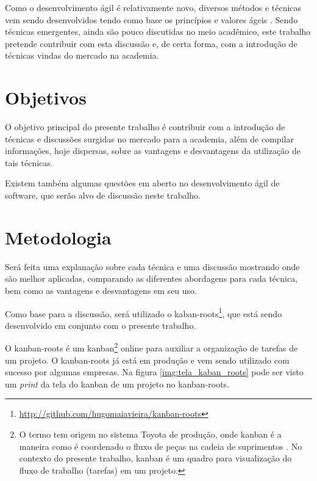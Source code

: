 Como o desenvolvimento ágil é relativamente novo, diversos métodos e técnicas
vem sendo desenvolvidos tendo como base os princípios e valores ágeis
\cite{BDDRodrigo}. Sendo técnicas emergentes, ainda são pouco discutidas no meio
acadêmico, este trabalho pretende contribuir com esta discussão e, de certa
forma, com a introdução de técnicas vindas do mercado na academia.



\section{Objetivos}

O objetivo principal do presente trabalho é contribuir com a introdução de
técnicas e discussões surgidas no mercado para a academia, além de compilar
informações, hoje dispersas, sobre as vantagens e desvantagens da utilização de
tais técnicas.

Existem também algumas questões em aberto no desenvolvimento ágil de software,
que serão alvo de discussão neste trabalho.

\section{Metodologia}

Será feita uma explanação sobre cada técnica e uma discussão mostrando onde são
melhor aplicadas, comparando as diferentes abordagens para cada técnica, bem
como as vantagens e desvantagens em seu uso.

Como base para a discussão, será utilizado o
kaban-roots\footnote{\url{http://github.com/hugomaiavieira/kanban-roots}}, que
está sendo desenvolvido em conjunto com o presente trabalho.

O kanban-roots é um kanban\footnote{O termo tem origem no sistema Toyota de
produção, onde kanban é a maneira como é coordenado o fluxo de peças na cadeia
de suprimentos  \cite{AMaquinaQueMudouOMundo}. No contexto do presente trabalho,
kanban é um quadro para visualização do fluxo de trabalho (tarefas) em um
projeto.} online para auxiliar a organização de tarefas de um projeto. O
kanban-roots já está em produção e vem sendo utilizado com sucesso por algumas
empresas. Na figura \ref{img:tela_kaban_roots} pode ser visto um \textit{print}
da tela do kanban de um projeto no kanban-roots.

